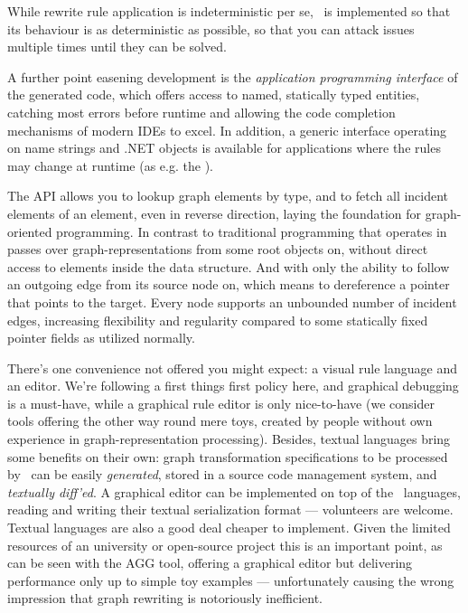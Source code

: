 While rewrite rule application is indeterministic per se, \GrG\ is implemented so that its behaviour is as deterministic as possible, so that you can attack issues multiple times until they can be solved.

A further point easening development is the \emph{application programming interface} of the generated code,
which offers access to named, statically typed entities, catching most errors before runtime and allowing the code completion mechanisms of modern IDEs to excel.
In addition, a generic interface operating on name strings and .NET objects is available for applications where the rules may change at runtime (as e.g. the \GrShell).

The API allows you to lookup graph elements by type, and to fetch all incident elements of an element, even in reverse direction, laying the foundation for graph-oriented programming.
In contrast to traditional programming that operates in passes over graph-representations from some root objects on, without direct access to elements inside the data structure. 
And with only the ability to follow an outgoing edge from its source node on, which means to dereference a pointer that points to the target.
Every node supports an unbounded number of incident edges, increasing flexibility and regularity compared to some statically fixed pointer fields as utilized normally.

There's one convenience not offered you might expect: a visual rule language and an editor.
We're following a first things first policy here, and graphical debugging is a must-have, while a graphical rule editor is only nice-to-have 
(we consider tools offering the other way round mere toys, created by people without own experience in graph-representation processing).%
Besides, textual languages bring some benefits on their own: graph transformation specifications to be processed by \GrG\ can be easily \emph{generated}, stored in a source code management system, and \emph{textually diff'ed}.
A graphical editor can be implemented on top of the \GrG\ languages, reading and writing their textual serialization format --- volunteers are welcome.
Textual languages are also a good deal cheaper to implement.
Given the limited resources of an university or open-source project this is an important point,
as can be seen with the AGG\cite{agg} tool, offering a graphical editor but delivering performance only up to simple toy examples
--- unfortunately causing the wrong impression that graph rewriting is notoriously inefficient.


